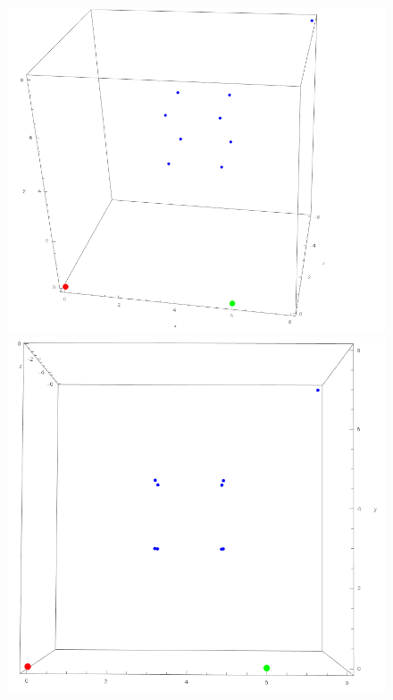 \begin{figure}[!htb]
	\includegraphics[width=\linewidth]{images/MinimalBeispiel_reconstructed.png}
	\label{fig:awesome_image1}
	\endminipage\hfill
	\includegraphics[width=\linewidth]{images/MinimalBeispiel_reconstructed_3.png}
	\label{fig:awesome_image2}
	\endminipage\hfill
\end{figure}


